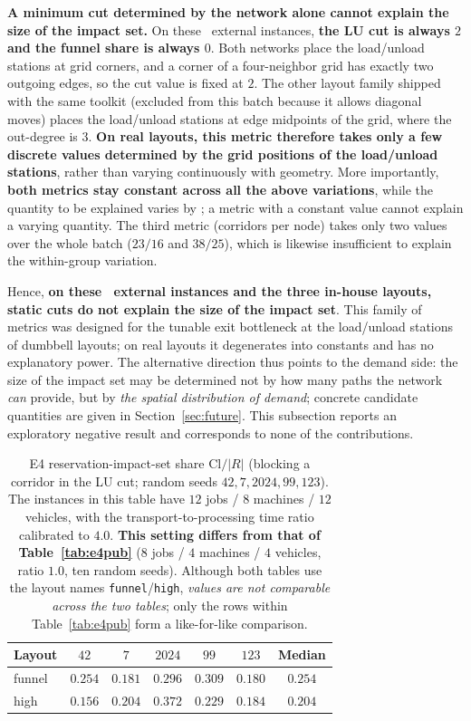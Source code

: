 \textbf{A minimum cut determined by the network alone cannot explain the size of the impact set.}
On these \NPubInst\ external instances, \textbf{the LU cut is always \(2\) and the funnel share is always \(0\)}.
Both networks place the load/unload stations at grid corners, and a corner of a four-neighbor grid has exactly two outgoing edges, so the cut value is fixed at \(2\).
The other layout family shipped with the same toolkit (excluded from this batch because it allows diagonal moves) places the load/unload stations at edge midpoints of the grid, where the out-degree is \(3\).
\textbf{On real layouts, this metric therefore takes only a few discrete values determined by the grid positions of the load/unload stations}, rather than varying continuously with geometry.
More importantly, \textbf{both metrics stay constant across all the above variations}, while the quantity to be explained varies by
\PubCloSpread; a metric with a constant value cannot explain a varying quantity. The third metric (corridors per node) takes only two values over the whole batch (\(23/16\) and
\(38/25\)), which is likewise insufficient to explain the within-group variation.

Hence, \textbf{on these \NPubInst\ external instances and the three in-house layouts, static cuts do not explain the size of the impact set}.
This family of metrics was designed for the tunable exit bottleneck at the load/unload stations of dumbbell layouts; on real layouts it degenerates into constants and has no explanatory power.
The alternative direction thus points to the demand side: the size of the impact set may be determined not by how many paths the network \emph{can} provide, but by
\emph{the spatial distribution of demand}; concrete candidate quantities are given in Section~\ref{sec:future}.
This subsection reports an exploratory negative result and corresponds to none of the contributions.

\begin{table}[t]
\centering
\caption{E4 reservation-impact-set share \(\mathrm{Cl}/|R|\) (blocking a corridor in the LU cut; random seeds \(42,7,2024,99,123\)).
The instances in this table have \(12\) jobs / \(8\) machines / \(12\) vehicles, with the transport-to-processing time ratio calibrated to \(4.0\).
\textbf{This setting differs from that of Table~\ref{tab:e4pub}} (\(8\) jobs / \(4\) machines / \(4\) vehicles,
ratio \(1.0\), ten random seeds). Although both tables use the layout names \texttt{funnel}/\texttt{high},
\emph{values are not comparable across the two tables}; only the rows within Table~\ref{tab:e4pub} form a like-for-like comparison.}
\label{tab:e4}
\small
\begin{tabular}{@{}lcccccc@{}}
\toprule
Layout & \(42\) & \(7\) & \(2024\) & \(99\) & \(123\) & Median \\
\midrule
funnel & \(0.254\) & \(0.181\) & \(0.296\) & \(0.309\) & \(0.180\) & \(0.254\) \\
high & \(0.156\) & \(0.204\) & \(0.372\) & \(0.229\) & \(0.184\) & \(0.204\) \\
\bottomrule
\end{tabular}
\end{table}

